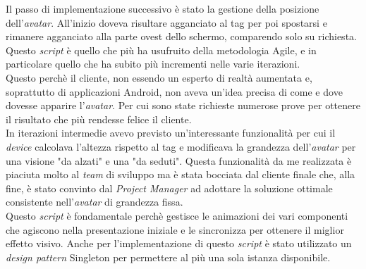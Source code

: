 Il passo di implementazione successivo \`e stato la gestione della posizione dell'\textit{avatar\gloss}. All'inizio doveva risultare agganciato al tag per poi spostarsi e rimanere agganciato alla parte ovest dello schermo, comparendo solo su richiesta.\\
Questo \textit{script} \`e quello che pi\`u ha usufruito della metodologia Agile, e in particolare quello che ha subito pi\`u incrementi nelle varie iterazioni.\\
Questo perch\`e il cliente, non essendo un esperto di realt\`a aumentata e, soprattutto di applicazioni Android, non aveva un'idea precisa di come e dove dovesse apparire l'\textit{avatar\gloss}. Per cui sono state richieste numerose prove per ottenere il risultato che pi\`u rendesse felice il cliente.\\
In iterazioni intermedie avevo previsto un'interessante funzionalit\`a per cui il \textit{device} calcolava l'altezza rispetto al tag e modificava la grandezza dell'\textit{avatar\gloss} per una visione "da alzati" e una "da seduti". Questa funzionalit\`a da me realizzata \`e piaciuta molto al \textit{team} di sviluppo ma \`e stata bocciata dal cliente finale che, alla fine, \`e stato convinto dal \textit{Project Manager} ad adottare la soluzione ottimale consistente nell'\textit{avatar\gloss} di grandezza fissa.\\
Questo \textit{script} \`e fondamentale perch\`e gestisce le animazioni dei vari componenti che agiscono nella presentazione iniziale e le sincronizza per ottenere il miglior effetto visivo.
Anche per l'implementazione di questo \textit{script} \`e stato utilizzato un \textit{design pattern} Singleton per permettere al pi\`u una sola istanza disponibile.\\\\

